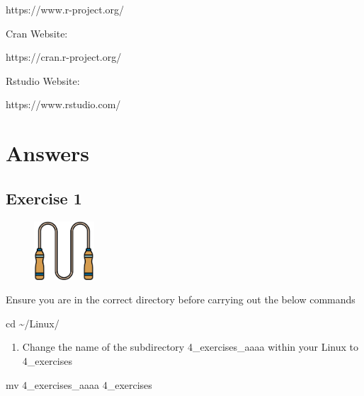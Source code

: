 \documentclass[
  letterpaper,
  DIV=11,
  numbers=noendperiod]{scrreprt}
\newenvironment{Shaded}{\begin{snugshade}}{\end{snugshade}}
\newcommand{\BuiltInTok}[1]{\textcolor[rgb]{0.00,0.23,0.31}{#1}}
\newcommand{\FunctionTok}[1]{\textcolor[rgb]{0.28,0.35,0.67}{#1}}
\newcommand{\NormalTok}[1]{\textcolor[rgb]{0.00,0.23,0.31}{#1}}
\providecommand{\tightlist}{%
  \setlength{\itemsep}{0pt}\setlength{\parskip}{0pt}}\usepackage{longtable,booktabs,array}
\begin{document}
https://www.r-project.org/

Cran Website:

https://cran.r-project.org/

Rstudio Website:

https://www.rstudio.com/

\part{Answers}

\hypertarget{exercise1_answers}{%
\chapter*{Exercise 1}\label{exercise1_answers}}


\begin{figure}

{\centering \includegraphics[width=0.2\textwidth,height=\textheight]{figures/exercise.png}

}

\end{figure}

Ensure you are in the correct directory before carrying out the below
commands

\begin{Shaded}
\begin{Highlighting}[]
\BuiltInTok{cd}\NormalTok{ \textasciitilde{}/Linux/}
\end{Highlighting}
\end{Shaded}

\begin{enumerate}
\def\labelenumi{\arabic{enumi}.}
\tightlist
\item
  Change the name of the subdirectory 4\_exercises\_aaaa within your
  Linux to 4\_exercises
\end{enumerate}

\begin{Shaded}
\begin{Highlighting}[]
\FunctionTok{mv}\NormalTok{ 4\_exercises\_aaaa 4\_exercises}
\end{Highlighting}
\end{Shaded}
\end{document}
